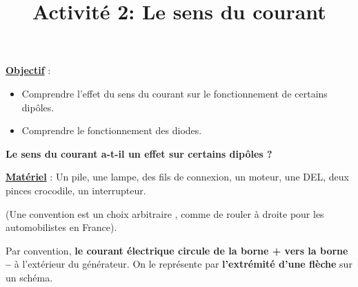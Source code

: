 \documentclass[10pt]{article}
\newcommand{\titreActivite}{Activité 2: Le sens du courant} %
\newcommand{\objectif}{ 	
	
	\begin{itemize}
		\item Comprendre l'effet du sens du courant sur le fonctionnement de certains dipôles.
		\item Comprendre le fonctionnement des diodes.
	\end{itemize}
}
\newcommand{\resumeContexte}{
	Le sens du courant a-t-il un effet sur certains dipôles ?
	} %
\begin{document}
\date{}
\title{\titreActivite}
\maketitle %


\underline{\textbf{Objectif}} :  \vspace{2pt}
\objectif

\vspace{4pt}


\textbf{\resumeContexte}


\vspace{-12pt}


\textbf{\underline{Matériel}} : Un pile, une lampe, des fils de connexion, un moteur, une DEL, deux pinces
 crocodile, un
interrupteur.


\begin{mybox}[Convention]
	(Une convention est un choix arbitraire
	, comme de rouler à droite pour les automobilistes en France). 
	
	Par convention,
	\textbf{le courant électrique circule de la borne +
	vers la borne –} à l’extérieur du générateur.
	On le représente par \textbf{l’extrémité d’une flèche} sur un schéma.

\end{mybox}





\end{document}
